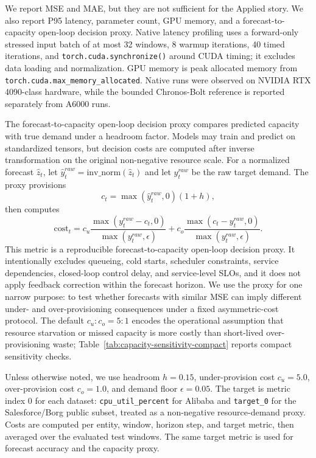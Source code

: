 \documentclass[conference]{IEEEtran}
\begin{document}
We report MSE and MAE, but they are not sufficient for the Applied story. We also report P95 latency, parameter count, GPU memory, and a forecast-to-capacity open-loop decision proxy. Native latency profiling uses a forward-only stressed input batch of at most 32 windows, 8 warmup iterations, 40 timed iterations, and \texttt{torch.cuda.synchronize()} around CUDA timing; it excludes data loading and normalization. GPU memory is peak allocated memory from \texttt{torch.cuda.max\_memory\_allocated}. Native runs were observed on NVIDIA RTX 4090-class hardware, while the bounded Chronos-Bolt reference is reported separately from A6000 runs.

The forecast-to-capacity open-loop decision proxy compares predicted capacity with true demand under a headroom factor. Models may train and predict on standardized tensors, but decision costs are computed after inverse transformation on the original non-negative resource scale. For a normalized forecast $\hat{z}_t$, let $\hat{y}^{raw}_t=\mathrm{inv\_norm}(\hat{z}_t)$ and let $y^{raw}_t$ be the raw target demand. The proxy provisions
\begin{equation}
c_t=\max(\hat{y}^{raw}_t,0)(1+h),
\end{equation}
then computes
\begin{equation}
\text{cost}_t =
c_u \frac{\max(y^{raw}_t-c_t,0)}{\max(y^{raw}_t,\epsilon)}
+ c_o \frac{\max(c_t-y^{raw}_t,0)}{\max(y^{raw}_t,\epsilon)}.
\end{equation}
This metric is a reproducible forecast-to-capacity open-loop decision proxy. It intentionally excludes queueing, cold starts, scheduler constraints, service dependencies, closed-loop control delay, and service-level SLOs, and it does not apply feedback correction within the forecast horizon. We use the proxy for one narrow purpose: to test whether forecasts with similar MSE can imply different under- and over-provisioning consequences under a fixed asymmetric-cost protocol. The default $c_u:c_o=5:1$ encodes the operational assumption that resource starvation or missed capacity is more costly than short-lived over-provisioning waste; Table~\ref{tab:capacity-sensitivity-compact} reports compact sensitivity checks.

Unless otherwise noted, we use headroom $h=0.15$, under-provision cost $c_u=5.0$, over-provision cost $c_o=1.0$, and demand floor $\epsilon=0.05$. The target is metric index 0 for each dataset: \texttt{cpu\_util\_percent} for Alibaba and \texttt{target\_0} for the Salesforce/Borg public subset, treated as a non-negative resource-demand proxy. Costs are computed per entity, window, horizon step, and target metric, then averaged over the evaluated test windows. The same target metric is used for forecast accuracy and the capacity proxy.
\end{document}
